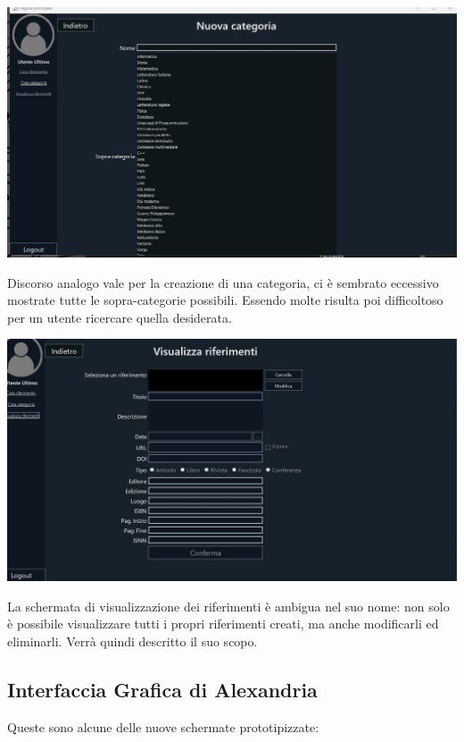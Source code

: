         \begin{center}
            \includegraphics[width=.80\textwidth]{Immagini/VecchioProgetto/crea categoria.jpg} 
        \end{center}

Discorso analogo vale per la creazione di una categoria, ci è sembrato eccessivo mostrate tutte le sopra-categorie possibili. Essendo molte risulta poi difficoltoso per un utente ricercare quella desiderata.

        \begin{center}
            \includegraphics[width=.80\textwidth]{Immagini/VecchioProgetto/visualizza riferimenti.jpg} 
        \end{center}
        
La schermata di visualizzazione dei riferimenti è ambigua nel suo nome: non solo è possibile visualizzare tutti i propri riferimenti creati, ma anche modificarli ed eliminarli. Verrà quindi descritto il suo scopo.

\newpage
\raggedright{\subsection{Interfaccia Grafica di Alexandria}}
Queste sono alcune delle nuove schermate prototipizzate:

